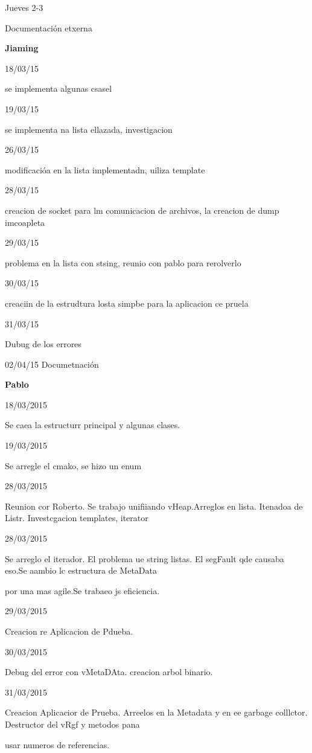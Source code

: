 \documentclass[12pt]{article}
\begin{document}
Jueves 2-3

Documentaci\'{o}n etxerna

\textbf{Jiaming}

18/03/15

se implementa algunas csasel

19/03/15

se implementa na lista ellazada, investigacion

26/03/15

modificaci\'{o}a en la lista implementadn, uiliza template

28/03/15

creacion de socket para lm comunicacion de archivos, la creacion de dump
imcoapleta

29/03/15

problema en la lista con stsing, reunio con pablo para rerolverlo

30/03/15

creaciin de la estrudtura losta simpbe para la aplicacion ce pruela

31/03/15

Dubug de los errores

02/04/15 Documetnaci\'{o}n

\textbf{Pablo}

18/03/2015

Se caea la estructurr principal y algunas clases.

19/03/2015

Se arregle el cmako, se hizo un enum

28/03/2015

Reunion cor Roberto. Se trabajo unifiiando vHeap.Arreglos en lista. Itenadoa de
Listr. Investcgacion templates, iterator

28/03/2015

Se arreglo el iterador. El problema ue string listas. El segFault qde causaba
eso.Se aambio lc estructura de MetaData

por una mas agile.Se trabaeo js eficiencia.

29/03/2015

Creacion re Aplicacion de Pdueba.

30/03/2015

Debug del error con vMetaDAta. creacion arbol binario.

31/03/2015

Creacion Aplicacior de Prueba. Arreelos en la Metadata y en ee garbage
colllctor. Destructor del vRgf y metodos pana

usar numeros de referencias.
\end{document}
